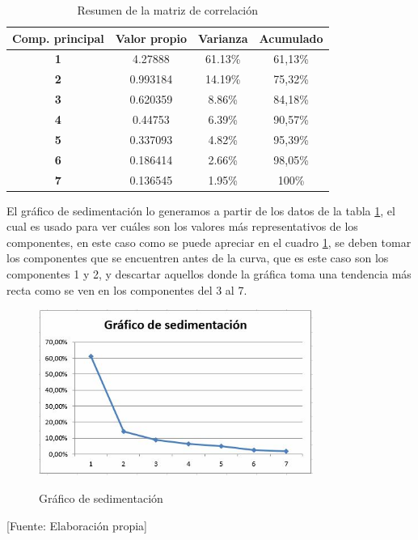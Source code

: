 \begin{table}[H]
\centering
\begin{tabular}{|c|c|c|c|}
\hline
\textbf{Comp. principal} & \textbf{Valor propio} & \textbf{Varianza} & \textbf{Acumulado} \\ \hline
\textbf{1}               & 4.27888             & 61.13\%           & 61,13\%            \\ \hline
\textbf{2}               & 0.993184            & 14.19\%           & 75,32\%            \\ \hline
\textbf{3}               & 0.620359            & 8.86\%            & 84,18\%            \\ \hline
\textbf{4}               & 0.44753             & 6.39\%            & 90,57\%            \\ \hline
\textbf{5}               & 0.337093            & 4.82\%            & 95,39\%            \\ \hline
\textbf{6}               & 0.186414            & 2.66\%            & 98,05\%            \\ \hline
\textbf{7}               & 0.136545            & 1.95\%            & 100\%              \\ \hline
\end{tabular}
\caption{Resumen de la matriz de correlación}
\label{tab:Resumen}
\end{table}


El gráfico de sedimentación lo generamos a partir de los datos de la tabla \ref{tab:Resumen}, el cual es usado para ver cuáles son los valores más representativos de los componentes, en este caso como se puede apreciar en el cuadro \ref{fig:Sedimentacion}, se deben tomar los componentes que se encuentren antes de la curva, que es este caso son los componentes 1 y 2, y descartar aquellos donde la gráfica toma una tendencia más recta como se ven en los componentes del 3 al 7.


\begin{figure}[H]
        \centering
        \caption{Gráfico de sedimentación}
        \includegraphics[width=0.8\textwidth]{figures/GraficoDeSedimantacion.JPG}
        \label{fig:Sedimentacion}
\end{figure}
\begin{center}
    [Fuente:  Elaboración propia]
\end{center}


